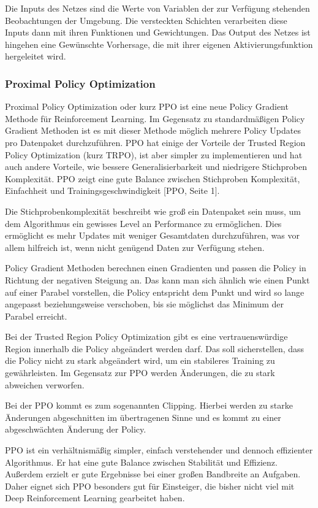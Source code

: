Die Inputs des Netzes sind die Werte von Variablen der zur Verfügung stehenden Beobachtungen der Umgebung. Die versteckten Schichten verarbeiten diese Inputs dann mit ihren Funktionen und Gewichtungen. Das Output des Netzes ist hingehen eine Gewünschte Vorhersage, die mit ihrer eigenen Aktivierungsfunktion hergeleitet wird.
\subsubsection{Proximal Policy Optimization}
Proximal Policy Optimization oder kurz PPO ist eine neue Policy Gradient Methode für Reinforcement Learning. Im Gegensatz zu standardmäßigen Policy Gradient Methoden ist es mit dieser Methode möglich mehrere Policy Updates pro Datenpaket durchzuführen. PPO hat einige der Vorteile der Trusted Region Policy Optimization (kurz TRPO), ist aber simpler zu implementieren und hat auch andere Vorteile, wie bessere Generalisierbarkeit und niedrigere Stichproben Komplexität. PPO zeigt eine gute Balance zwischen Stichproben Komplexität, Einfachheit und Trainingsgeschwindigkeit [PPO, Seite 1].

Die Stichprobenkomplexität beschreibt wie groß ein Datenpaket sein muss, um dem Algorithmus ein gewisses Level an Performance zu ermöglichen. Dies ermöglicht es mehr Updates mit weniger Gesamtdaten durchzuführen, was vor allem hilfreich ist, wenn nicht genügend Daten zur Verfügung stehen.

Policy Gradient Methoden berechnen einen Gradienten und passen die Policy in Richtung der negativen Steigung an. Das kann man sich ähnlich wie einen Punkt auf einer Parabel vorstellen, die Policy entspricht dem Punkt und wird so lange angepasst beziehungsweise verschoben, bis sie möglichst das Minimum der Parabel erreicht.

Bei der Trusted Region Policy Optimization gibt es eine vertrauenswürdige Region innerhalb die Policy abgeändert werden darf. Das soll sicherstellen, dass die Policy nicht zu stark abgeändert wird, um ein stabileres Training zu gewährleisten. Im Gegensatz zur PPO werden Änderungen, die zu stark abweichen verworfen.

Bei der PPO kommt es zum sogenannten Clipping. Hierbei werden zu starke Änderungen abgeschnitten im übertragenen Sinne und es kommt zu einer abgeschwächten Änderung der Policy.

PPO ist ein verhältnismäßig simpler, einfach verstehender und dennoch effizienter Algorithmus. Er hat eine gute Balance zwischen Stabilität und Effizienz. Außerdem erzielt er gute Ergebnisse bei einer großen Bandbreite an Aufgaben. Daher eignet sich PPO besonders gut für Einsteiger, die bisher nicht viel mit Deep Reinforcement Learning gearbeitet haben.
